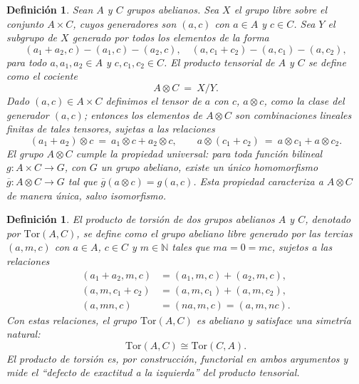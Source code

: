 \documentclass[12pt]{book}
\theoremstyle{plain}
\numberwithin{equation}{section} %
\newtheorem{definition}[thm]{Definición}
\begin{document}
\begin{definition}\label{def:tensor-product}
Sean $A$ y $C$ grupos abelianos. Sea $X$ el grupo libre sobre el conjunto
$A \times C$, cuyos generadores son $(a,c)$ con $a \in A$ y $c \in C$.
Sea $Y$ el subgrupo de $X$ generado por todos los elementos de la forma
\[
(a_1 + a_2, c) - (a_1, c) - (a_2, c), \quad
(a, c_1 + c_2) - (a, c_1) - (a, c_2),
\]
para todo $a,a_1,a_2 \in A$ y $c,c_1,c_2 \in C$. El \textit{producto tensorial}
de $A$ y $C$ se define como el cociente
\[
A \otimes C \ =\ X / Y.
\]
Dado $(a,c) \in A \times C$ definimos el tensor de $a$ con $c$, $a \otimes c$, como la clase del generador $(a,c)$; entonces los elementos de
$A \otimes C$ son combinaciones lineales finitas de tales tensores, sujetas a
las relaciones
\[
(a_1 + a_2) \otimes c \ =\ a_1 \otimes c + a_2 \otimes c, \qquad
a \otimes (c_1 + c_2) \ =\ a \otimes c_1 + a \otimes c_2.
\]
El grupo $A \otimes C$ cumple la \textit{propiedad universal}: para toda
función bilineal $g : A \times C \to G$, con $G$ un grupo abeliano, existe un único
homomorfismo $\overline{g} : A \otimes C \to G$ tal que
$\overline{g}(a \otimes c) = g(a,c)$. Esta propiedad caracteriza a
$A \otimes C$ de manera única, salvo isomorfismo.
\end{definition}

\begin{definition}\label{def:tor}
El \textit{producto de torsión} de dos grupos abelianos $A$ y $C$, denotado por
$\mathrm{Tor}(A,C)$, se define como el grupo abeliano libre generado por las tercias
$(a,m,c)$ con $a \in A$, $c \in C$ y $m \in \mathbb{N}$ tales que $ma = 0 = mc$,
sujetos a las relaciones
\[
\begin{aligned*}
(a_1 + a_2, m, c) &= (a_1, m, c) + (a_2, m, c),\\
(a, m, c_1 + c_2) &= (a, m, c_1) + (a, m, c_2),\\
(a, mn, c) &= (na, m, c) = (a, m, nc).
\end{aligned*}
\]
Con estas relaciones, el grupo $\mathrm{Tor}(A,C)$ es abeliano y satisface una
\textit{simetría natural}:
\[
\mathrm{Tor}(A,C) \cong \mathrm{Tor}(C,A).
\]
El producto de torsión es, por construcción, functorial en ambos argumentos y
mide el ``defecto de exactitud a la izquierda'' del producto tensorial.
\end{definition}

\end{document}
